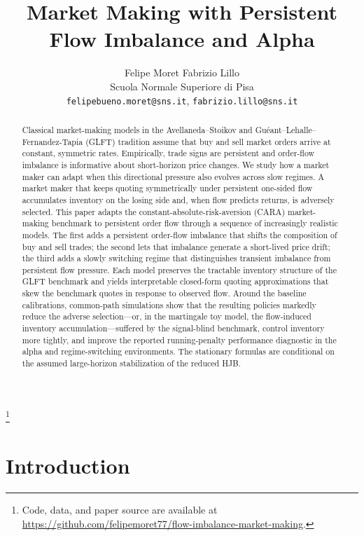 \documentclass[11pt,a4paper]{article}
\title{Market Making with Persistent Flow Imbalance and Alpha}
\author{%
  Felipe Moret \quad Fabrizio Lillo \\[2pt]
  \small Scuola Normale Superiore di Pisa \\
  \small \texttt{felipebueno.moret@sns.it}, \;
  \texttt{fabrizio.lillo@sns.it}%
}
\date{}
\theoremstyle{plain}
\theoremstyle{definition}
\newcommand\blfootnote[1]{%
  \begingroup
  \renewcommand\thefootnote{}\footnote{#1}%
  \addtocounter{footnote}{-1}%
  \endgroup
}
\begin{document}
\maketitle
\blfootnote{Code, data, and paper source are available at
\url{https://github.com/felipemoret77/flow-imbalance-market-making}.}

\begin{abstract}
Classical market-making models in the Avellaneda--Stoikov and
Gu\'eant--Lehalle--Fernandez-Tapia (GLFT) tradition assume that buy and sell
market orders arrive at constant, symmetric rates.  Empirically, trade signs
are persistent and order-flow imbalance is informative about short-horizon
price changes.  We study how a market maker can adapt when this directional
pressure also evolves across slow regimes.  A market maker that keeps quoting
symmetrically under persistent one-sided flow accumulates inventory on the
losing side and, when flow predicts returns, is adversely selected.
This paper adapts the constant-absolute-risk-aversion (CARA) market-making
benchmark to persistent order flow through a sequence of increasingly
realistic models.  The first adds a persistent order-flow imbalance that shifts
the composition of buy and sell trades; the second lets that imbalance
generate a short-lived price drift; the third adds a slowly switching regime
that distinguishes transient imbalance from persistent flow pressure.  Each
model preserves the tractable inventory structure of the GLFT benchmark and
yields interpretable closed-form quoting approximations that skew the benchmark
quotes in response to observed flow.  Around the baseline calibrations,
common-path simulations show that the resulting policies markedly reduce the
adverse selection---or, in the martingale toy model, the flow-induced inventory
accumulation---suffered by the signal-blind benchmark, control inventory more
tightly, and improve the reported running-penalty performance diagnostic in the
alpha and regime-switching environments.  The stationary formulas are
conditional on the assumed large-horizon stabilization of the reduced HJB.
\end{abstract}

\section{Introduction}
\label{sec:intro}
\end{document}
